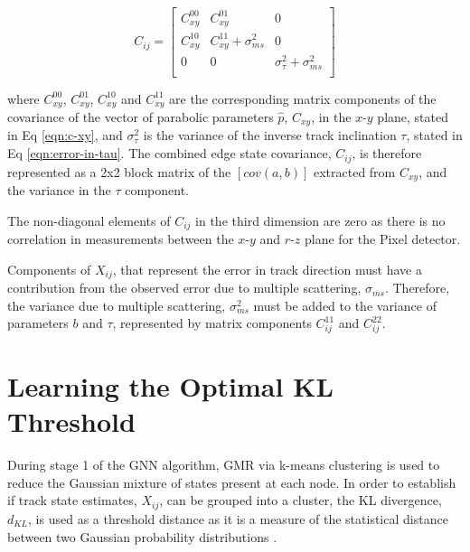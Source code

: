 \begin{equation}
    C_{ij} = \begin{bmatrix} 
            C_{xy}^{00} & C_{xy}^{01} & 0 \\ 
            C_{xy}^{10} & C_{xy}^{11} + \sigma_{ms}^2 & 0 \\ 
            0 & 0 & \sigma_{\tau}^{2} + \sigma_{ms}^2 \\
            \end{bmatrix} 
    \label{eqn:combined-edge-state-covariance}
\end{equation}

where $C_{xy}^{00}$, $C_{xy}^{01}$, $C_{xy}^{10}$ and $C_{xy}^{11}$ are the corresponding matrix components of the covariance of the vector of parabolic parameters $\hat{p}$, $C_{xy}$, in the $x$-$y$ plane, stated in Eq \eqref{eqn:c-xy}, and $\sigma_{\tau}^2$ is the variance of the inverse track inclination $\tau$, stated in Eq \eqref{eqn:error-in-tau}. The combined edge state covariance, $C_{ij}$, is therefore represented as a 2x2 block matrix of the $[cov(a, b)]$ extracted from $C_{xy}$, and the variance in the $\tau$ component.

The non-diagonal elements of $C_{ij}$ in the third dimension are zero as there is no correlation in measurements between the $x$-$y$ and $r$-$z$ plane for the Pixel detector.

Components of $X_{ij}$, that represent the error in track direction must have a contribution from the observed error due to multiple scattering, $\sigma_{ms}$. Therefore, the variance due to multiple scattering, $\sigma_{ms}^2$ must be added to the variance of parameters $b$ and $\tau$, represented by matrix components $C_{ij}^{11}$ and $C_{ij}^{22}$.




\section{Learning the Optimal KL Threshold}
\label{chapter-6-kl-threshold}

During stage 1 of the GNN algorithm, GMR via k-means clustering is used to reduce the Gaussian mixture of states present at each node. In order to establish if track state estimates, $X_{ij}$, can be grouped into a cluster, the KL divergence, $d_{KL}$, is used as a threshold distance as it is a measure of the statistical distance between two Gaussian probability distributions \cite{KL, FRUHWIRTH19971}.

